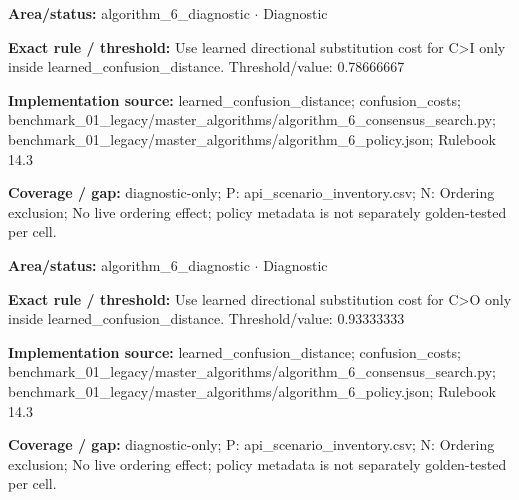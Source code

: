 \begin{tcolorbox}[enhanced,breakable,colback=white,colframe=Muted!45,boxrule=0.45pt,arc=1.5pt,left=6pt,right=6pt,top=5pt,bottom=5pt,title={\texttt{A6-LEARNED-SUBSTITUTION-C-I}},title after break={\texttt{A6-LEARNED-SUBSTITUTION-C-I}\ (continued)},fonttitle=\headingfont\bfseries\color{Navy},coltitle=Navy]
\textbf{Area/status:} algorithm\_\allowbreak{}6\_\allowbreak{}diagnostic $\boldsymbol{\cdot}$ Diagnostic\par
\smallskip
\textbf{Exact rule / threshold:} Use learned directional substitution cost for C>I only inside learned\_\allowbreak{}confusion\_\allowbreak{}distance. Threshold/\allowbreak{}value: 0.78666667\par
\smallskip
\textbf{Implementation source:} learned\_\allowbreak{}confusion\_\allowbreak{}distance; confusion\_\allowbreak{}costs; benchmark\_\allowbreak{}01\_\allowbreak{}legacy/\allowbreak{}master\_\allowbreak{}algorithms/\allowbreak{}algorithm\_\allowbreak{}6\_\allowbreak{}consensus\_\allowbreak{}search.py; benchmark\_\allowbreak{}01\_\allowbreak{}legacy/\allowbreak{}master\_\allowbreak{}algorithms/\allowbreak{}algorithm\_\allowbreak{}6\_\allowbreak{}policy.json; Rulebook 14.3\par
\smallskip
\textbf{Coverage / gap:} diagnostic-only; P: api\_\allowbreak{}scenario\_\allowbreak{}inventory.csv; N: Ordering exclusion; No live ordering effect; policy metadata is not separately golden-tested per cell.
\end{tcolorbox}
\begin{tcolorbox}[enhanced,breakable,colback=white,colframe=Muted!45,boxrule=0.45pt,arc=1.5pt,left=6pt,right=6pt,top=5pt,bottom=5pt,title={\texttt{A6-LEARNED-SUBSTITUTION-C-O}},title after break={\texttt{A6-LEARNED-SUBSTITUTION-C-O}\ (continued)},fonttitle=\headingfont\bfseries\color{Navy},coltitle=Navy]
\textbf{Area/status:} algorithm\_\allowbreak{}6\_\allowbreak{}diagnostic $\boldsymbol{\cdot}$ Diagnostic\par
\smallskip
\textbf{Exact rule / threshold:} Use learned directional substitution cost for C>O only inside learned\_\allowbreak{}confusion\_\allowbreak{}distance. Threshold/\allowbreak{}value: 0.93333333\par
\smallskip
\textbf{Implementation source:} learned\_\allowbreak{}confusion\_\allowbreak{}distance; confusion\_\allowbreak{}costs; benchmark\_\allowbreak{}01\_\allowbreak{}legacy/\allowbreak{}master\_\allowbreak{}algorithms/\allowbreak{}algorithm\_\allowbreak{}6\_\allowbreak{}consensus\_\allowbreak{}search.py; benchmark\_\allowbreak{}01\_\allowbreak{}legacy/\allowbreak{}master\_\allowbreak{}algorithms/\allowbreak{}algorithm\_\allowbreak{}6\_\allowbreak{}policy.json; Rulebook 14.3\par
\smallskip
\textbf{Coverage / gap:} diagnostic-only; P: api\_\allowbreak{}scenario\_\allowbreak{}inventory.csv; N: Ordering exclusion; No live ordering effect; policy metadata is not separately golden-tested per cell.
\end{tcolorbox}

